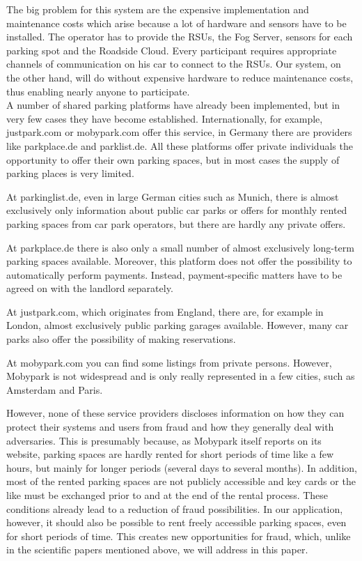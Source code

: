The big problem for this system are the expensive implementation and maintenance costs which arise because a lot of hardware and sensors have to be installed. The operator has to provide the RSUs, the Fog Server, sensors for each parking spot and the Roadside Cloud. Every participant requires appropriate channels of communication on his car to connect to the RSUs. Our system, on the other hand, will do without expensive hardware to reduce maintenance costs, thus enabling nearly anyone to participate.\\


A number of shared parking platforms have already been implemented, but in very few cases they have become established. Internationally, for example, justpark.com or mobypark.com offer this service, in Germany there are providers like parkplace.de and parklist.de. All these platforms offer private individuals the opportunity to offer their own parking spaces, but in most cases the supply of parking places is very limited.

At parkinglist.de, even in large German cities such as Munich, there is almost exclusively only information about public car parks or offers for monthly rented parking spaces from car park operators, but there are hardly any private offers.

At parkplace.de there is also only a small number of almost exclusively long-term parking spaces available. Moreover, this platform does not offer the possibility to automatically perform payments. Instead, payment-specific matters have to be agreed on with the landlord separately.

At justpark.com, which originates from England, there are, for example in London, almost exclusively public parking garages available. However, many car parks also offer the possibility of making reservations.

At mobypark.com you can find some listings from private persons. However, Mobypark is not widespread and is only really represented in a few cities, such as Amsterdam and Paris.

However, none of these service providers discloses information on how they can protect their systems and users from fraud and how they generally deal with adversaries. This is presumably because, as Mobypark itself reports on its website, parking spaces are hardly rented for short periods of time like a few hours, but mainly for longer periods (several days to several months). In addition, most of the rented parking spaces are not publicly accessible and key cards or the like must be exchanged prior to and at the end of the rental process. These conditions already lead to a reduction of fraud possibilities. In our application, however, it should also be possible to rent freely accessible parking spaces, even for short periods of time. This creates new opportunities for fraud, which, unlike in the scientific papers mentioned above, we will address in this paper.

